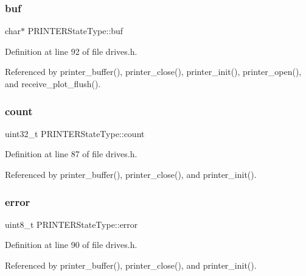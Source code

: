\subsubsection{\texorpdfstring{buf}{buf}}
{\footnotesize\ttfamily char$\ast$ P\+R\+I\+N\+T\+E\+R\+State\+Type\+::buf}



Definition at line 92 of file drives.\+h.



Referenced by printer\+\_\+buffer(), printer\+\_\+close(), printer\+\_\+init(), printer\+\_\+open(), and receive\+\_\+plot\+\_\+flush().

\mbox{\label{structPRINTERStateType_ae115fc351910f3801e37b31f254fb8f4}} 
\subsubsection{\texorpdfstring{count}{count}}
{\footnotesize\ttfamily uint32\+\_\+t P\+R\+I\+N\+T\+E\+R\+State\+Type\+::count}



Definition at line 87 of file drives.\+h.



Referenced by printer\+\_\+buffer(), printer\+\_\+close(), and printer\+\_\+init().

\mbox{\label{structPRINTERStateType_a6e5b550f5396901febd5475445132dd0}} 
\subsubsection{\texorpdfstring{error}{error}}
{\footnotesize\ttfamily uint8\+\_\+t P\+R\+I\+N\+T\+E\+R\+State\+Type\+::error}



Definition at line 90 of file drives.\+h.



Referenced by printer\+\_\+buffer(), printer\+\_\+close(), and printer\+\_\+init().

\mbox{\label{structPRINTERStateType_a791c78d68d169f9d2e60d34b890e520a}} 
